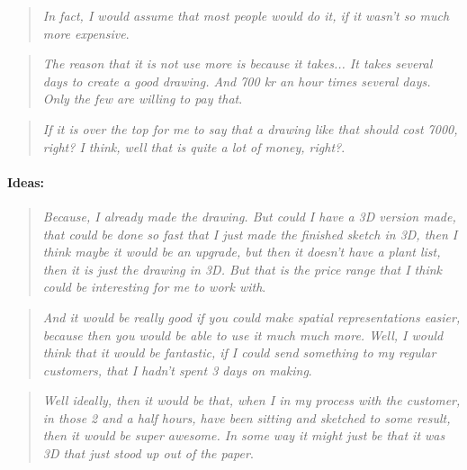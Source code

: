 		\begin{quote}
			\textit{In fact, I would assume that most people would do it, if it wasn't so much more expensive}\label{quote:expertRessources2}.\\
		\end{quote}

		\begin{quote}
			\textit{The reason that it is not use more is because it takes... It takes several days to create a good drawing. And 700 kr an hour times several days. Only the few are willing to pay that}\label{quote:expertRessources3}.\\
		\end{quote}
		
		\begin{quote}
			\textit{If it is over the top for me to say that a drawing like that should cost 7000, right? I think, well that is quite a lot of money, right?}\label{quote:expertRessources4}.\\
		\end{quote}
		
		\paragraph*{Ideas:}
		\begin{quote}
			\textit{Because, I already made the drawing. But could I have a 3D version made, that could be done so fast that I just made the finished sketch in 3D, then I think maybe it would be an upgrade, but then it doesn't have a plant list, then it is just the drawing in 3D. But that is the price range that I think could be interesting for me to work with}\label{quote:expertIdeas1}.\\
		\end{quote}
		
		\begin{quote}
			\textit{And it would be really good if you could make spatial representations easier, because then you would be able to use it much much more. Well, I would think that it would be fantastic, if I could send something to my regular customers, that I hadn't spent 3 days on making}\label{quote:expertIdeas2}.\\
		\end{quote}
	
		\begin{quote}
			\textit{Well ideally, then it would be that, when I in my process with the customer, in those 2 and a half hours, have been sitting and sketched to some result, then it would be super awesome. In some way it might just be that it was 3D that just stood up out of the paper}\label{quote:expertIdeas3}.\\
		\end{quote}
		
